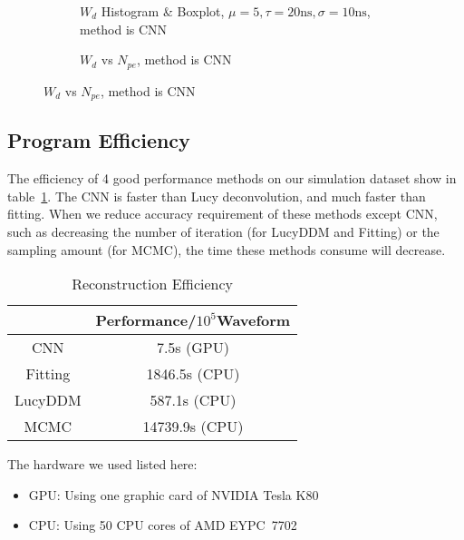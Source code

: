 \begin{figure}[H]
\begin{minipage}[t]{.5\textwidth}
\begin{figure}[H]
    \centering
    \resizebox{\textwidth}{!}{}
    \caption{\label{fig:cnn-hist} $W_{d}$ Histogram \& Boxplot, $\mu=5, \tau=20\mathrm{ns}, \sigma=10\mathrm{ns}$, method is CNN}
\end{figure}
\end{minipage}
\begin{minipage}[t]{.5\textwidth}
\begin{figure}[H]
    \centering
    \resizebox{\textwidth}{!}{}
    \caption{\label{fig:cnn-npe} $W_{d}$ vs $N_{pe}$, method is CNN}
\end{figure}
\end{minipage}
\end{figure}

\subsection{Program Efficiency}

The efficiency of 4 good performance methods on our simulation dataset show in table~\ref{fig:efficiency}. The CNN is faster than Lucy deconvolution, and much faster than fitting. When we reduce accuracy requirement of these methods except CNN, such as decreasing the number of iteration (for LucyDDM and Fitting) or the sampling amount (for MCMC), the time these methods consume will decrease. 

\begin{table}[H]
    \centering
    \caption{\label{fig:efficiency} Reconstruction Efficiency}
    \begin{tabular}{c|c}
        \hline
        & Performance/$10^{5}$Waveform \\
        \hline
        CNN & 7.5s (GPU) \\
        \hline
        Fitting & 1846.5s (CPU) \\
        \hline
        LucyDDM & 587.1s (CPU) \\
        \hline
        MCMC & 14739.9s (CPU) \\
        \hline
    \end{tabular}
\end{table}
\hspace{4mm}

The hardware we used listed here: 
\begin{center}
\begin{itemize}
    \item GPU: Using one graphic card of NVIDIA\textsuperscript{\textregistered} Tesla\textsuperscript{\textregistered} K80
    \item CPU: Using 50 CPU cores of AMD EYPC\texttrademark\ 7702
\end{itemize}
\end{center}

